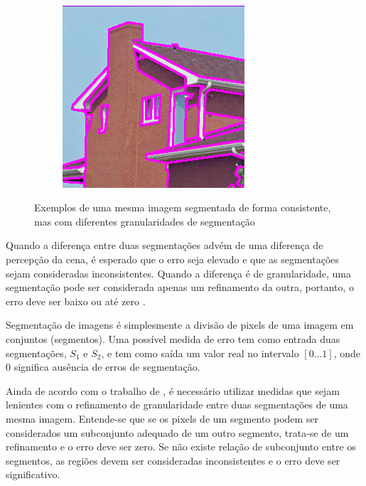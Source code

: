 \begin{figure}[h]
\begin{subfigure}[b]{0.3\textwidth}
  \end{subfigure}%
  ~
  \begin{subfigure}[b]{0.3\textwidth}
    \includegraphics[width=\textwidth]{imgs/granularidade_3}
  \end{subfigure}%
  \caption{Exemplos de uma mesma imagem segmentada de forma consistente, mas com diferentes granularidades de segmentação}
  \label{fig:granularidade}
\end{figure}

Quando a diferença entre duas segmentações advém de uma diferença de percepção da cena, é esperado que o erro seja elevado e que as segmentações sejam consideradas inconsistentes. Quando a diferença é de granularidade, uma segmentação pode ser considerada apenas um refinamento da outra, portanto, o erro deve ser baixo ou até zero \cite{martin:2001}.

Segmentação de imagens é simplesmente a divisão de pixels de uma imagem em conjuntos (segmentos). Uma possível medida de erro tem como entrada duas segmentações, $S_1$ e $S_2$, e tem como saída um valor real no intervalo $[0...1]$, onde $0$ significa ausência de erros de segmentação.

Ainda de acordo com o trabalho de , é necessário utilizar medidas que sejam lenientes com o refinamento de granularidade entre duas segmentações de uma mesma imagem. Entende-se que se os pixels de um segmento podem ser considerados um subconjunto adequado de um outro segmento, trata-se de um refinamento e o erro deve ser zero. Se não existe relação de subconjunto entre os segmentos, as regiões devem ser consideradas inconsistentes e o erro deve ser significativo.

